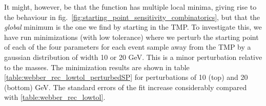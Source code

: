\documentclass[twoside,english]{uiofysmaster}
\begin{document}
It might, however, be that the function has multiple local minima, giving rise to the behaviour in fig.\ \ref{fig:starting_point_sensitivity_combinatorics}, but that the {\it global} minimum is the one we find by starting in the TMP. To investigate this, we have run minimizations (with low tolerance) where we perturb the starting point of each of the four parameters for each event sample away from the TMP by a gaussian distribution of width 10 or 20 GeV. This is a minor perturbation relative to the masses. The minimization results are shown in table \ref{table:webber_rec_lowtol_perturbedSP} for perturbations of 10 (top) and 20 (bottom) GeV. The standard errors of the fit increase considerably compared with \ref{table:webber_rec_lowtol}. 
 

\end{document}
